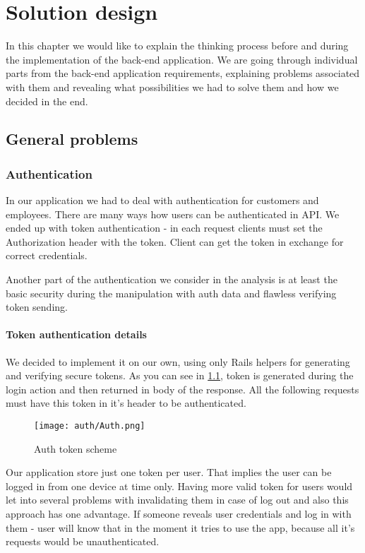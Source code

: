 \chapter{Solution design}
In this chapter we would like to explain the thinking process before and during the implementation of the back-end application. We are going through individual parts from the back-end application requirements, explaining problems associated with them and revealing what possibilities we had to solve them and how we decided in the end.

\section{General problems}
\subsection{Authentication}
In our application we had to deal with authentication for customers and employees. There are many ways how users can be authenticated in API. We ended up with token authentication - in each request clients must set the Authorization header with the token. Client can get the token in exchange for correct credentials.

Another part of the authentication we consider in the analysis is at least the basic security during the manipulation with auth data and flawless verifying token sending.

\subsubsection{Token authentication details}

We decided to implement it on our own, using only Rails helpers for generating and verifying secure tokens. As you can see in \ref{auth-token-scheme}, token is generated during the login action and then returned in body of the response. All the following requests must have this token in it's header to be authenticated.

\begin{figure}[h]\centering
\texttt{[image: auth/Auth.png]} 
\caption{Auth token scheme}\label{auth-token-scheme}
\end{figure}

Our application store just one token per user. That implies the user can be logged in from one device at time only. Having more valid token for users would let into several problems with invalidating them in case of log out and also this approach has one advantage. If someone reveals user credentials and log in with them - user will know that in the moment it tries to use the app, because all it's requests would be unauthenticated.


